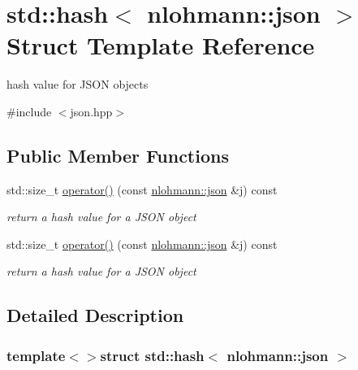 \hypertarget{structstd_1_1hash_3_01nlohmann_1_1json_01_4}{\section{std\-:\-:hash$<$ nlohmann\-:\-:json $>$ Struct Template Reference}
\label{structstd_1_1hash_3_01nlohmann_1_1json_01_4}
}


hash value for J\-S\-O\-N objects  




{\ttfamily \#include $<$json.\-hpp$>$}

\subsection*{Public Member Functions}
\begin{DoxyCompactItemize}
\item 
std\-::size\-\_\-t \hyperlink{structstd_1_1hash_3_01nlohmann_1_1json_01_4_afd03f6ad53db22868ca4163a8200b2f9_afd03f6ad53db22868ca4163a8200b2f9}{operator()} (const \hyperlink{namespacenlohmann_a9cc9a3033850a092f791d86854d117fc_a9cc9a3033850a092f791d86854d117fc}{nlohmann\-::json} \&j) const 
\begin{DoxyCompactList}\small\item\em return a hash value for a J\-S\-O\-N object \end{DoxyCompactList}\item 
std\-::size\-\_\-t \hyperlink{structstd_1_1hash_3_01nlohmann_1_1json_01_4_afd03f6ad53db22868ca4163a8200b2f9_afd03f6ad53db22868ca4163a8200b2f9}{operator()} (const \hyperlink{namespacenlohmann_a9cc9a3033850a092f791d86854d117fc_a9cc9a3033850a092f791d86854d117fc}{nlohmann\-::json} \&j) const 
\begin{DoxyCompactList}\small\item\em return a hash value for a J\-S\-O\-N object \end{DoxyCompactList}\end{DoxyCompactItemize}


\subsection{Detailed Description}
\subsubsection*{template$<$$>$struct std\-::hash$<$ nlohmann\-::json $>$}

